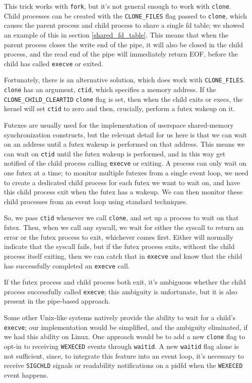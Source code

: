 \documentclass[letterpaper,twocolumn,10pt]{article}
\begin{document}
This trick works with \texttt{fork},
but it's not general enough to work with \texttt{clone}.
Child processes can be created with the \verb|CLONE_FILES| flag passed to \texttt{clone},
which causes the parent process and child process to share a single fd table;
we showed an example of this in section \ref{shared_fd_table}.
This means that when the parent process closes the write end of the pipe,
it will also be closed in the child process,
and the read end of the pipe will immediately return EOF,
before the child has called \texttt{execve} or exited.

Fortunately, there is an alternative solution, which does work with \verb|CLONE_FILES|.
\texttt{clone} has an argument, \texttt{ctid}, which specifies a memory address.
If the \verb|CLONE_CHILD_CLEARTID| \texttt{clone} flag is set,
then when the child exits or execs,
the kernel will set \texttt{ctid} to zero and then,
crucially, perform a futex wakeup on it.

Futexes are usually used for the implementation of userspace shared-memory synchronization constructs,
but the relevant detail for us here is that we can wait on an address
until a futex wakeup is performed on that address.\cite{futex}
This means we can wait on \texttt{ctid} until the futex wakeup is performed,
and in this way get notified of the child process calling \texttt{execve} or exiting.
A process can only wait on one futex at a time;
to monitor multiple futexes from a single event loop,
we need to create a dedicated child process for each futex we want to wait on,
and have this child process exit when the futex has a wakeup.
We can then monitor these child processes from an event loop using standard techniques.\cite{signalfd}\cite{pidfd}

So, we pass \texttt{ctid} whenever we call \texttt{clone},
and set up a process to wait on that futex.
Then, when we call any syscall,
we wait for either the syscall to return an error or the futex process to exit,
whichever comes first.
Either will normally indicate that the syscall fails,
but if the futex process exits,
without the child process itself exiting,
then we can catch that in \texttt{execve}
and know that the child has successfully completed an \texttt{execve} call.

If the futex process and child process both exit,
it's ambiguous whether the child process successfully called \texttt{execve};
this ambiguity is unfortunate, but it is also present in the pipe-based approach.

Some other Unix-like systems natively provide the ability to wait for a child's \texttt{execve};
our implementation would be simplified, and the ambiguity eliminated,
if we had this ability on Linux.\cite{freebsd_kqueue}
One approach would be to add a new \texttt{clone} flag to
opt-in to receiving \texttt{WEXECED} events through \texttt{waitid}.
A new \texttt{waitid} flag alone is not sufficient,
since, to integrate this feature into an event loop,
it's necessary to receive \texttt{SIGCHLD} signals or readability notifications on a pidfd
when the \texttt{WEXECED} event happens.
\end{document}
